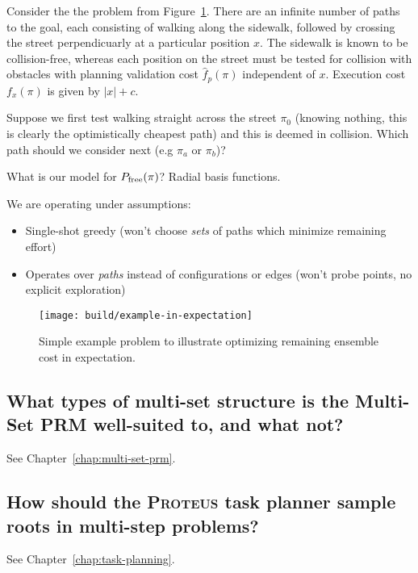 {Consider the the problem from Figure~\ref{fig:example-in-expectation}.
There are an infinite number of paths to the goal,
each consisting of walking along the sidewalk,
followed by crossing the street perpendicuarly at a particular
position $x$.
The sidewalk is known to be collision-free,
whereas each position on the street must be tested for collision
with obstacles with planning validation cost $\hat{f}_p(\pi)$
independent of $x$.
Execution cost $f_x(\pi)$ is given by $|x|+c$.

Suppose we first test walking straight across the street $\pi_0$
(knowing nothing, this is clearly the optimistically cheapest path)
and this is deemed in collision.
Which path should we consider next (e.g $\pi_a$ or $\pi_b$)?

What is our model for $P_{\mbox{\scriptsize free}}(\pi)$?
Radial basis functions.

We are operating under assumptions:
\begin{itemize}
\item Single-shot greedy (won't choose \emph{sets} of paths
   which minimize remaining effort)
\item Operates over \emph{paths} instead of configurations
   or edges (won't probe points, no explicit exploration)
\end{itemize}

\begin{figure}
   \begin{center}
   \texttt{[image: build/example-in-expectation]}
   \end{center}
   \caption{Simple example problem to illustrate optimizing
      remaining ensemble cost in expectation.}
   \label{fig:example-in-expectation}
\end{figure}

\subsection{What types of multi-set structure is the Multi-Set PRM
   well-suited to, and what not?}
\label{ques:multi-set-suited}

See Chapter~\ref{chap:multi-set-prm}.

\subsection{How should the \textsc{Proteus} task planner
   sample roots in multi-step problems?}
\label{ques:how-sequence}

See Chapter~\ref{chap:task-planning}.

}
